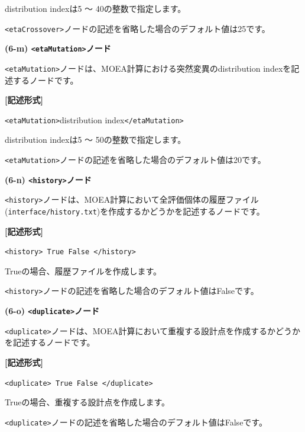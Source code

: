 \documentclass[a4paper,11pt]{jarticle}
\begin{document}
{\vspace{8pt}
\leftskip=0pt
distribution indexは5 〜 40の整数で指定します。

\texttt{<etaCrossover>}ノードの記述を省略した場合のデフォルト値は25です。

\vspace{12pt}
\textbf{(6-m) \texttt{<etaMutation>}ノード}

\texttt{<etaMutation>}ノードは、MOEA計算における突然変異のdistribution indexを記述するノードです。

\vspace{8pt}
\leftskip=12pt
\textbf{[記述形式]}

\leftskip=42pt
\texttt{<etaMutation>}distribution index\texttt{</etaMutation>}

\vspace{8pt}
\leftskip=0pt
distribution indexは5 〜 50の整数で指定します。

\texttt{<etaMutation>}ノードの記述を省略した場合のデフォルト値は20です。

\vspace{12pt}
\textbf{(6-n) \texttt{<history>}ノード}

\texttt{<history>}ノードは、MOEA計算において全評価個体の履歴ファイル({\tt interface/history.txt})を作成するかどうかを記述するノードです。

\vspace{8pt}
\leftskip=12pt
\textbf{[記述形式]}

\leftskip=42pt
\texttt{<history> True \textbar{} False </history>}

\vspace{8pt}
\leftskip=0pt
Trueの場合、履歴ファイルを作成します。

\texttt{<history>}ノードの記述を省略した場合のデフォルト値はFalseです。

\vspace{12pt}
\textbf{(6-o) \texttt{<duplicate>}ノード}

\texttt{<duplicate>}ノードは、MOEA計算において重複する設計点を作成するかどうかを記述するノードです。

\vspace{8pt}
\leftskip=12pt
\textbf{[記述形式]}

\leftskip=42pt
\texttt{<duplicate> True \textbar{} False </duplicate>}

\vspace{8pt}
\leftskip=0pt
Trueの場合、重複する設計点を作成します。

\texttt{<duplicate>}ノードの記述を省略した場合のデフォルト値はFalseです。


}
\end{document}
